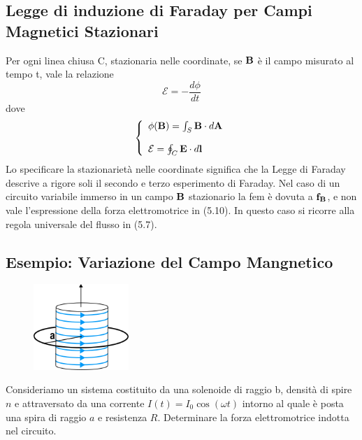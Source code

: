 \subsection{Legge di induzione di Faraday per Campi Magnetici Stazionari}

Per ogni linea chiusa C, stazionaria nelle coordinate,  se $\bold{B}$ \`e il campo misurato al tempo t, vale la relazione 
\begin{equation*}
	\mathcal{E} = - \frac{d\phi}{dt}
\end{equation*}
dove 
\begin{align}
	\left \{ \begin{array}{l}
		\phi(\bold{B}) = \int_{S} \bold{B} \cdot d\bold{A} \\ \rule{0pt}{20pt}
		\mathcal{E} = \oint_C \bold{E} \cdot d \bold{l}
	\end{array}\right .
\end{align} 
Lo specificare la stazionariet\`a nelle coordinate significa che la Legge di Faraday descrive a rigore soli il secondo e terzo esperimento di Faraday. Nel caso di un circuito variabile immerso in un campo $\bold{B}$ stazionario la fem \`e dovuta a $\bold{f_B}$, e non vale l'espressione della forza elettromotrice in (5.10). In questo caso si ricorre alla regola universale del flusso in (5.7).

\subsection{Esempio: Variazione del Campo Mangnetico}

\begin{figure}  %
    \centering
    \includegraphics[width=0.32\textwidth]{images/solenoid_spire} %
\end{figure}

Consideriamo un sistema costituito da una solenoide di raggio b, densit\`a di spire $n$ e attraversato da una corrente $I(t) = I_0 \cos(\omega t)$ intorno al quale \`e posta una spira di raggio $a$ e resistenza $R$. Determinare la forza elettromotrice indotta nel circuito.

